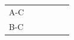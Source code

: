 {\begin{tabular}[t]{|l|l|l|l|l|l|}
     \tabularnewline\cline{1-1}\cline{2-2}\cline{3-3}\cline{4-4}\cline{5-5}\cline{6-6}
        A-C &
         &
         &
         &
         &
     \tabularnewline\cline{1-1}\cline{2-2}\cline{3-3}\cline{4-4}\cline{5-5}\cline{6-6}
        B-C &
         &
         &
         &
         &
     \tabularnewline\cline{1-1}\cline{2-2}\cline{3-3}\cline{4-4}\cline{5-5}\cline{6-6}
    \end{tabular}} %
